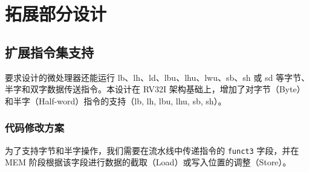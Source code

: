 \documentclass[12pt,a4paper]{article}
\begin{document}
\clearpage

\section{拓展部分设计}

\subsection{扩展指令集支持}

要求设计的微处理器还能运行 lb、lh、ld、lbu、lhu、lwu、sb、sh 或 sd 等字节、半字和双字数据传送指令。本设计在 RV32I 架构基础上，增加了对字节（Byte）和半字（Half-word）指令的支持（lb, lh, lbu, lhu, sb, sh）。

\subsubsection{代码修改方案}

为了支持字节和半字操作，我们需要在流水线中传递指令的 \texttt{funct3} 字段，并在 MEM 阶段根据该字段进行数据的截取（Load）或写入位置的调整（Store）。
\end{document}
